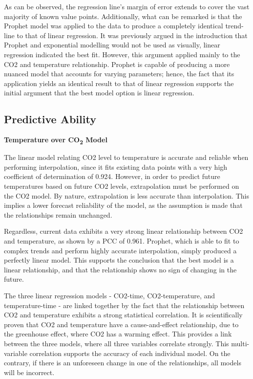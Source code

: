 \documentclass[12pt]{mcmthesis}
\begin{document}
    As can be observed, the regression line’s margin of error extends to cover the vast majority of known value points. Additionally, what can be remarked is that the Prophet model was applied to the data to produce a completely identical trend-line to that of linear regression. It was previously argued in the introduction that Prophet and exponential modelling would not be used as visually, linear regression indicated the best fit. However, this argument applied mainly to the CO2 and temperature relationship. Prophet is capable of producing a more nuanced model that accounts for varying parameters; hence, the fact that its application yields an identical result to that of linear regression supports the initial argument that the best model option is linear regression.


    \subsection{Predictive Ability}

    \noindent\textbf{Temperature over CO\textsubscript{2} Model}

    The linear model relating CO2 level to temperature is accurate and reliable when performing interpolation, since it fits existing data points with a very high coefficient of determination of 0.924. However, in order to predict future temperatures based on future CO2 levels, extrapolation must be performed on the CO2 model. By nature, extrapolation is less accurate than interpolation. This implies a lower forecast reliability of the model, as the assumption is made that the relationships remain unchanged.

    Regardless, current data exhibits a very strong linear relationship between CO2 and temperature, as shown by a PCC of 0.961. Prophet, which is able to fit to complex trends and perform highly accurate interpolation, simply produced a perfectly linear model. This supports the conclusion that the best model is a linear relationship, and that the relationship shows no sign of changing in the future.

    The three linear regression models - CO2-time, CO2-temperature, and temperature-time - are linked together by the fact that the relationship between CO2 and temperature exhibits a  strong statistical correlation. It is scientifically proven that CO2 and temperature have a cause-and-effect relationship, due to the greenhouse effect, where CO2 has a warming effect. This provides a link between the three models, where all three variables correlate strongly. This multi-variable correlation supports the accuracy of each individual model. On the contrary, if there is an unforeseen change in one of the relationships, all models will be incorrect.
\end{document}
